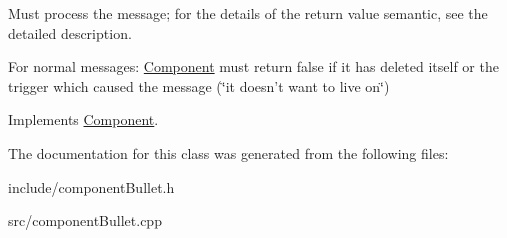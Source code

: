 \-Must process the message; for the details of the return value semantic, see the detailed description. 

\-For normal messages\-: \hyperlink{classComponent}{\-Component} must return false if it has deleted itself or the trigger which caused the message (\char`\"{}it doesn't want to live on\char`\"{}) 

\-Implements \hyperlink{classComponent_a5c34b629ba4b6e2925045ef965d4d560}{\-Component}.



\-The documentation for this class was generated from the following files\-:\begin{DoxyCompactItemize}
\item 
include/component\-Bullet.\-h\item 
src/component\-Bullet.\-cpp\end{DoxyCompactItemize}
